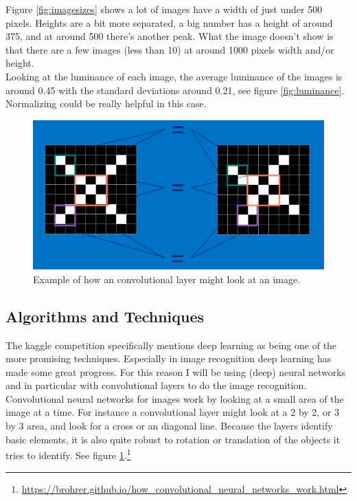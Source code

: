 \documentclass[11pt]{article}
\begin{document}
\begin{figure}
\begin{subfigure}{.515\textwidth}
    \end{subfigure}
\end{figure}
Figure \ref{fig:imagesizes} shows a lot of images have a width of just under 500 pixels. Heights are a bit more separated, a big number has a height of around 375, and at around 500 there's another peak. What the image doesn't  show is that there are a few images (less than 10) at around 1000 pixels width and/or height.\\

Looking at the luminance of each image, the average luminance of the images is around 0.45 with the standard deviations around 0.21, see figure \ref{fig:luminance}. Normalizing could be really helpful in this case.

\begin{figure}
    \centering
    \includegraphics[width=\textwidth]{images/cnn3}
    \caption{Example of how an convolutional layer might look at an image.}
    \label{fig:cnn}
\end{figure}

\subsection{Algorithms and Techniques}
The kaggle competition specifically mentions deep learning as being one of the more promising techniques. Especially in image recognition deep learning has made some great progress. For this reason I will be using (deep) neural networks and in particular with convolutional layers to do the image recognition.\\

Convolutional neural networks for images work by looking at a small area of the image at a time. For instance a convolutional layer might look at a 2 by 2, or 3 by 3 area, and look for a cross or an diagonal line. Because the layers identify basic elements, it is also quite robust to rotation or translation of the objects it tries to identify. See figure \ref{fig:cnn}.\footnote{\url{https://brohrer.github.io/how_convolutional_neural_networks_work.html}}\\
\end{document}
